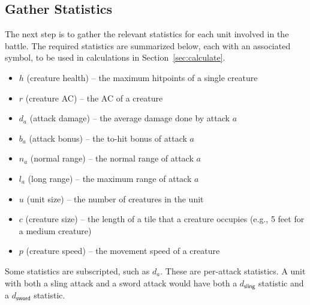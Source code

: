 \subsection{Gather Statistics}

The next step is to gather the relevant statistics
for each unit involved in the battle.
The required statistics are summarized below,
each with an associated symbol,
to be used in calculations in Section~\ref{sec:calculate}.
%
\begin{itemize}
    \item $h$ (creature health) -- the maximum hitpoints of a single creature
    \item $r$ (creature AC) -- the AC of a creature
    \item $d_a$ (attack damage) -- the average damage done by attack $a$
    \item $b_a$ (attack bonus) -- the to-hit bonus of attack $a$
    \item $n_a$ (normal range) -- the normal range of attack $a$
    \item $l_a$ (long range) -- the maximum range of attack $a$
    \item $u$ (unit size) -- the number of creatures in the unit
    \item $c$ (creature size) -- the length of a tile that a creature occupies
        (e.g., 5 feet for a medium creature)
    \item $p$ (creature speed) -- the movement speed of a creature
\end{itemize}
%
Some statistics are subscripted, such as $d_a$.
These are per-attack statistics.
A unit with both a sling attack and a sword attack
would have both a $d_\textsf{sling}$ statistic
and a $d_\textsf{sword}$ statistic.